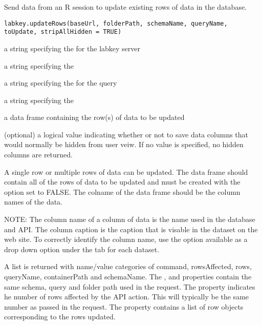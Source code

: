 \documentclass{article}
\begin{document}
\begin{Description}\relax
Send data from an R session to update existing rows of data in the database.
\end{Description}
\begin{Usage}
\begin{verbatim}
labkey.updateRows(baseUrl, folderPath, schemaName, queryName, toUpdate, stripAllHidden = TRUE)
\end{verbatim}
\end{Usage}
\begin{Arguments}
\begin{ldescription}
\item[\code{baseUrl}] a string specifying the for the labkey server
\item[\code{folderPath}] a string specifying the  
\item[\code{schemaName}] a string specifying the  for the query
\item[\code{queryName}] a string specifying the  
\item[\code{toUpdate}] a data frame containing the row(s) of data to be updated
\item[\code{stripAllHidden}] (optional) a logical value indicating whether or not to save data columns that would 
normally be hidden from user veiw. If no value is specified, no hidden columns are returned.
\end{ldescription}
\end{Arguments}
\begin{Details}\relax
A single row or multiple rows of data can be updated.  The  data frame should contain 
all of the rows of data to be updated and must be created with the  option
set to FALSE.  The colname of the data frame should be the column names of the data.

NOTE: The column name of a column of data is the name used in the database and API. The column caption is the
caption that is visable in the dataset on the web site. To correctly identify the column name, use the       
 option available as a drop down option under the  tab for each dataset.
\end{Details}
\begin{Value}
A list is returned with name/value categories of command, rowsAffected, rows, queryName, containerPath and schemaName.
The ,  and  properties contain the same schema, query 
and folder path used in the request.  The
 property indicates he number of rows affected by the API action. This will typically be the same
number as passed in the request. The  property contains a list of row objects corresponding to the rows
updated.
\end{Value}
\end{document}

